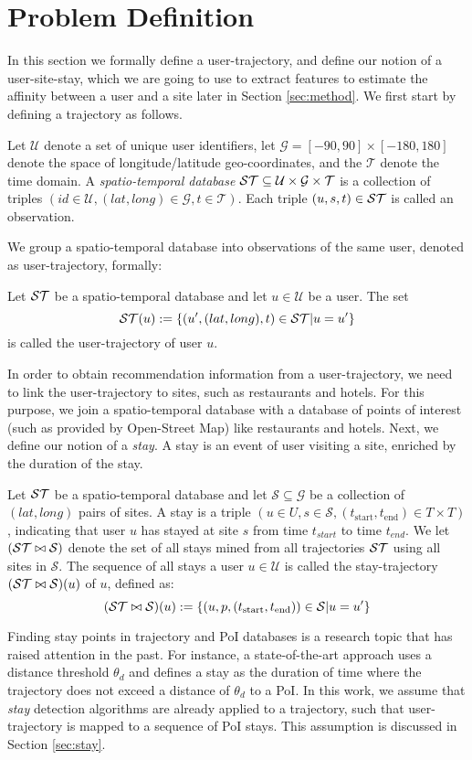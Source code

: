 \section{Problem Definition}
\label{sec:probdef}
In this section we formally define a user-trajectory, and define our notion of a user-site-stay, which we are going 
to use to extract features to estimate the affinity between a user and a site later in Section \ref{sec:method}. 
We first start by defining a trajectory as follows.
\begin{definition}
Let $\mathcal{U}$ denote a set of unique user identifiers, let $\mathcal{G}=[-90,90]\times [-180,180]$ denote the space of longitude/latitude geo-coordinates, and the $\mathcal{T}$ denote the time domain.
A \emph{spatio-temporal database} $\mathcal{ST}\subseteq \mathcal{U}\times \mathcal{G}\times \mathcal{T}$ is a collection of triples $(id\in\mathcal{U},(lat,long)\in\mathcal{G},t\in\mathcal{T})$. Each triple $(u,s,t)\in\mathcal{ST}$ is called an observation.
\end{definition}
We group a spatio-temporal database into observations of the same user, denoted as user-trajectory, formally:
\begin{definition}
Let $\mathcal{ST}$ be a spatio-temporal database and let $u\in\mathcal{U}$ be a user. The set
$$
\mathcal{ST}(u):=\{(u^\prime,(lat,long),t)\in\mathcal{ST}|u=u^\prime\}
$$
is called the user-trajectory of user $u$.
\end{definition}
In order to obtain recommendation information from a user-trajectory, we need to link the user-trajectory to sites, such as restaurants and hotels. For this purpose, we join a spatio-temporal database with a database of points of interest (such as provided by Open-Street Map) like restaurants and hotels. Next, we define our notion of a \emph{stay}. A stay is an event of user visiting a site, enriched by the duration of the stay.
\begin{definition}
Let $\mathcal{ST}$ be a spatio-temporal database and let $\mathcal{S}\subseteq \mathcal{G}$ be a collection of $(lat,long)$ pairs of sites. A stay is a triple $(u\in U,s\in\mathcal{S},(t_\text{start},t_\text{end})\in T\times T)$, indicating that user $u$ has stayed at site $s$ from time $t_{start}$ to time $t_{end}$.
We let $(\mathcal{ST}\bowtie\mathcal{S})$ denote the set of all stays mined from all trajectories $\mathcal{ST}$ using all sites in $\mathcal{S}$. 
The sequence of all stays a user $u\in\mathcal{U}$ is called the stay-trajectory $(\mathcal{ST}\bowtie\mathcal{S})(u)$ of $u$, defined as:
$$
(\mathcal{ST}\bowtie\mathcal{S})(u):=\{(u,p,(t_\text{start},t_\text{end}))\in\mathcal{S}|u=u^\prime\}
$$
\end{definition}
Finding stay points in trajectory and PoI databases is a research topic that has raised attention in the past. For instance, a state-of-the-art approach \cite{li2008mining,zheng2009mining,zheng2010geolife,xiao2010finding} uses a distance threshold $\theta_{d}$ and defines a stay as the duration of time where the trajectory does not exceed a distance of $\theta_{d}$ to a PoI. In this work, we assume that \emph{stay} detection algorithms are already applied to a trajectory, such that user-trajectory is mapped to a sequence of PoI stays. This assumption is discussed in Section \ref{sec:stay}.

